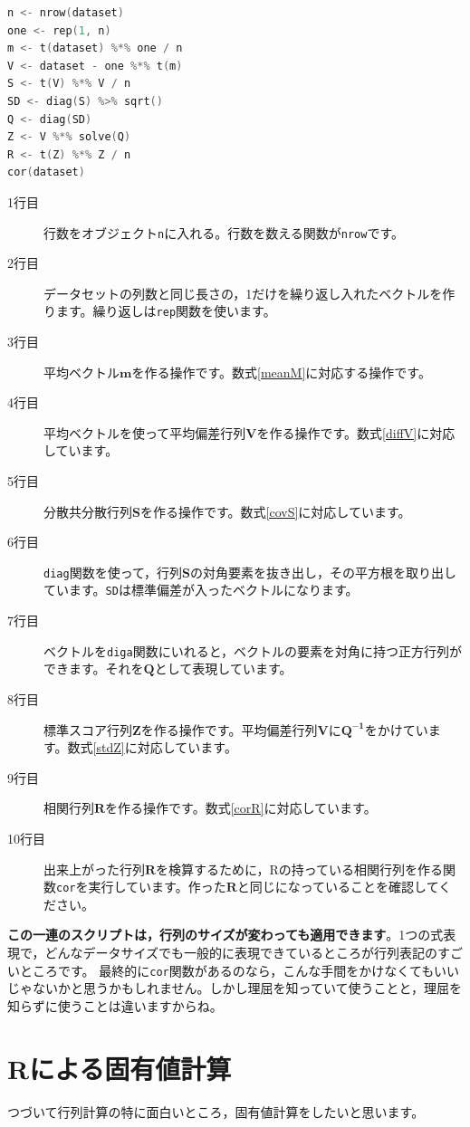\documentclass{ltjsbook}
\begin{document}
\begin{lstlisting}[language=c++,label={code::09_05},caption={データの行列演算}]
n <- nrow(dataset)
one <- rep(1, n)
m <- t(dataset) %*% one / n
V <- dataset - one %*% t(m)
S <- t(V) %*% V / n
SD <- diag(S) %>% sqrt()
Q <- diag(SD)
Z <- V %*% solve(Q)
R <- t(Z) %*% Z / n
cor(dataset)
\end{lstlisting}
\begin{description}
    \item[1行目] 行数をオブジェクト\texttt{n}に入れる。行数を数える関数が\texttt{nrow}です。
    \item[2行目] データセットの列数と同じ長さの，1だけを繰り返し入れたベクトルを作ります。繰り返しは\texttt{rep}関数を使います。
    \item[3行目] 平均ベクトル$\bm{m}$を作る操作です。数式\ref{meanM}に対応する操作です。
    \item[4行目] 平均ベクトルを使って平均偏差行列$\bm{V}$を作る操作です。数式\ref{diffV}に対応しています。
    \item[5行目] 分散共分散行列$\bm{S}$を作る操作です。数式\ref{covS}に対応しています。
    \item[6行目] \texttt{diag}関数を使って，行列$\bm{S}$の対角要素を抜き出し，その平方根を取り出しています。\texttt{SD}は標準偏差が入ったベクトルになります。
    \item[7行目] ベクトルを\texttt{diga}関数にいれると，ベクトルの要素を対角に持つ正方行列ができます。それを$\bm{Q}$として表現しています。
    \item[8行目] 標準スコア行列$\bm{Z}$を作る操作です。平均偏差行列$\bm{V}$に$\bm{Q^{-1}}$をかけています。数式\ref{stdZ}に対応しています。
    \item[9行目] 相関行列$\bm{R}$を作る操作です。数式\ref{corR}に対応しています。
    \item[10行目] 出来上がった行列$\bm{R}$を検算するために，Rの持っている相関行列を作る関数\texttt{cor}を実行しています。作った$\bm{R}$と同じになっていることを確認してください。
\end{description}

\textbf{この一連のスクリプトは，行列のサイズが変わっても適用できます}。1つの式表現で，どんなデータサイズでも一般的に表現できているところが行列表記のすごいところです。
最終的に\texttt{cor}関数があるのなら，こんな手間をかけなくてもいいじゃないかと思うかもしれません。しかし理屈を知っていて使うことと，理屈を知らずに使うことは違いますからね。

\section{Rによる固有値計算}
つづいて行列計算の特に面白いところ，固有値計算をしたいと思います。
\end{document}
